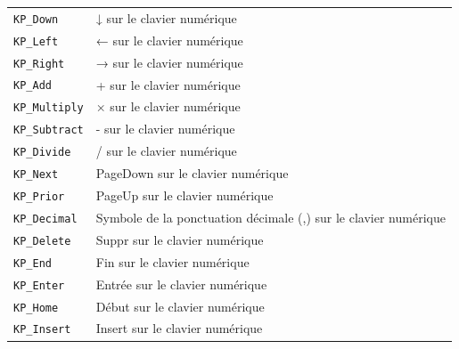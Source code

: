 \documentclass[11pt,a4paper]{article}
\begin{document}
\begin{tabular}{ll}
{\tt KP\_Down} 	& 	↓ sur le clavier numérique\\
{\tt KP\_Left} 	& 	← sur le clavier numérique\\
{\tt KP\_Right} 	& 	→ sur le clavier numérique\\
{\tt KP\_Add} 	& 	+ sur le clavier numérique\\
{\tt KP\_Multiply} 	& 	× sur le clavier numérique\\
{\tt KP\_Subtract} 	& 	- sur le clavier numérique\\
{\tt KP\_Divide} 	& 	/ sur le clavier numérique\\
{\tt KP\_Next} 	& 	PageDown sur le clavier numérique\\
{\tt KP\_Prior} 	& 	PageUp sur le clavier numérique\\
{\tt KP\_Decimal} 	& 	Symbole de la ponctuation décimale (,) sur le clavier numérique\\
{\tt KP\_Delete} 	& 	Suppr sur le clavier numérique\\
{\tt KP\_End} 	& 	Fin sur le clavier numérique\\
{\tt KP\_Enter} 	& 	Entrée sur le clavier numérique\\
{\tt KP\_Home} 	& 	Début sur le clavier numérique\\
{\tt KP\_Insert} 	& 	Insert sur le clavier numérique\\
\end{tabular}{}
\end{document}

